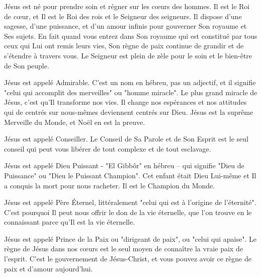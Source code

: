 

Jésus est né pour prendre soin et régner sur les cœurs des hommes. Il est le Roi de cœur, et Il est le Roi des rois et le Seigneur des seigneurs. Il dispose d'une sagesse, d'une puissance, et d'un amour infinis pour gouverner Son royaume et Ses sujets. En fait quand vous entrez dans Son royaume qui est constitué par tous ceux qui Lui ont remis leurs vies, Son règne de paix continue de grandir et de s'étendre à travers vous. Le Seigneur est plein de zèle pour le soin et le bien-être de Son peuple.

Jésus est appelé Admirable. C'est un nom en hébreu, pas un adjectif, et il signifie "celui qui accomplit des merveilles" ou "homme miracle". Le plus grand miracle de Jésus, c'est qu'Il transforme nos vies. Il change nos espérances et nos attitudes qui de centrés sur nous-mêmes deviennent centrés sur Dieu. Jésus est la suprême Merveille du Monde, et Noël en est la preuve.

Jésus est appelé Conseiller. Le Conseil de Sa Parole et de Son Esprit est le seul conseil qui peut vous libérer de tout complexe et de tout esclavage.

Jésus est appelé Dieu Puissant - "El Gibbôr" en hébreu – qui signifie "Dieu de Puissance" ou "Dieu le Puissant Champion". Cet enfant était Dieu Lui-même et Il a conquis la mort pour nous racheter. Il est le Champion du Monde.

Jésus est appelé Père Éternel, littéralement "celui qui est à l'origine de l'éternité". C'est pourquoi Il peut nous offrir le don de la vie éternelle, que l'on trouve en le connaissant parce qu'Il est la vie éternelle.



Jésus est appelé Prince de la Paix ou "dirigeant de paix", ou "celui qui apaise". Le règne de Jésus dans nos cœurs est le seul moyen de connaître la vraie paix de l'esprit. C'est le gouvernement de Jésus-Christ, et vous pouvez avoir ce règne de paix et d'amour aujourd'hui.







